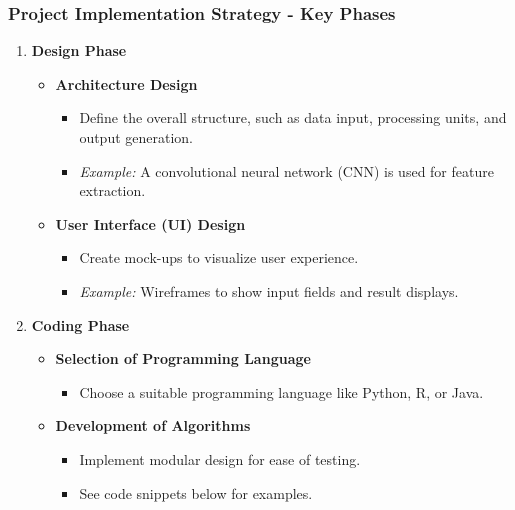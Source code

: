 \documentclass[aspectratio=169]{beamer}
\begin{document}
\begin{frame}[fragile]
    \frametitle{Project Implementation Strategy - Key Phases}
    \begin{enumerate}
        \item \textbf{Design Phase}
            \begin{itemize}
                \item \textbf{Architecture Design}
                    \begin{itemize}
                        \item Define the overall structure, such as data input, processing units, and output generation.
                        \item \textit{Example:} A convolutional neural network (CNN) is used for feature extraction.
                    \end{itemize}
                \item \textbf{User Interface (UI) Design}
                    \begin{itemize}
                        \item Create mock-ups to visualize user experience.
                        \item \textit{Example:} Wireframes to show input fields and result displays.
                    \end{itemize}
            \end{itemize}
        \item \textbf{Coding Phase}
            \begin{itemize}
                \item \textbf{Selection of Programming Language}
                    \begin{itemize}
                        \item Choose a suitable programming language like Python, R, or Java.
                    \end{itemize}
                \item \textbf{Development of Algorithms}
                    \begin{itemize}
                        \item Implement modular design for ease of testing.
                        \item See code snippets below for examples.
                    \end{itemize}
            \end{itemize}
    \end{enumerate}
\end{frame}
\end{document}
